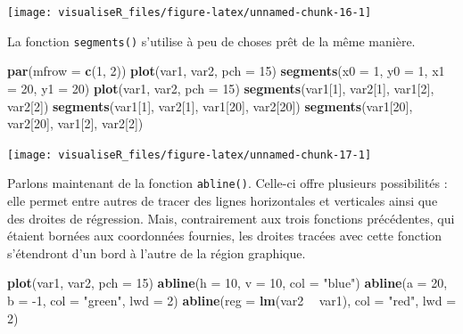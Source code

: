 \documentclass[]{article}
\newenvironment{Shaded}{\begin{snugshade}}{\end{snugshade}}
\newcommand{\DataTypeTok}[1]{\textcolor[rgb]{0.13,0.29,0.53}{#1}}
\newcommand{\DecValTok}[1]{\textcolor[rgb]{0.00,0.00,0.81}{#1}}
\newcommand{\KeywordTok}[1]{\textcolor[rgb]{0.13,0.29,0.53}{\textbf{#1}}}
\newcommand{\NormalTok}[1]{#1}
\newcommand{\OperatorTok}[1]{\textcolor[rgb]{0.81,0.36,0.00}{\textbf{#1}}}
\newcommand{\StringTok}[1]{\textcolor[rgb]{0.31,0.60,0.02}{#1}}
\begin{document}
\begin{center}\texttt{[image: visualiseR\_files/figure-latex/unnamed-chunk-16-1]} \end{center}

La fonction \texttt{segments()} s'utilise à peu de choses prêt de la même manière.

\begin{Shaded}
\begin{Highlighting}[]
\KeywordTok{par}\NormalTok{(}\DataTypeTok{mfrow =} \KeywordTok{c}\NormalTok{(}\DecValTok{1}\NormalTok{, }\DecValTok{2}\NormalTok{))}
\KeywordTok{plot}\NormalTok{(var1, var2, }\DataTypeTok{pch =} \DecValTok{15}\NormalTok{)}
\KeywordTok{segments}\NormalTok{(}\DataTypeTok{x0 =} \DecValTok{1}\NormalTok{, }\DataTypeTok{y0 =} \DecValTok{1}\NormalTok{, }\DataTypeTok{x1 =} \DecValTok{20}\NormalTok{, }\DataTypeTok{y1 =} \DecValTok{20}\NormalTok{)}
\KeywordTok{plot}\NormalTok{(var1, var2, }\DataTypeTok{pch =} \DecValTok{15}\NormalTok{)}
\KeywordTok{segments}\NormalTok{(var1[}\DecValTok{1}\NormalTok{], var2[}\DecValTok{1}\NormalTok{], var1[}\DecValTok{2}\NormalTok{], var2[}\DecValTok{2}\NormalTok{])}
\KeywordTok{segments}\NormalTok{(var1[}\DecValTok{1}\NormalTok{], var2[}\DecValTok{1}\NormalTok{], var1[}\DecValTok{20}\NormalTok{], var2[}\DecValTok{20}\NormalTok{])}
\KeywordTok{segments}\NormalTok{(var1[}\DecValTok{20}\NormalTok{], var2[}\DecValTok{20}\NormalTok{], var1[}\DecValTok{2}\NormalTok{], var2[}\DecValTok{2}\NormalTok{])}
\end{Highlighting}
\end{Shaded}

\begin{center}\texttt{[image: visualiseR\_files/figure-latex/unnamed-chunk-17-1]} \end{center}

Parlons maintenant de la fonction \texttt{abline()}. Celle-ci offre plusieurs possibilités : elle permet entre autres de tracer des lignes horizontales et verticales ainsi que des droites de régression. Mais, contrairement aux trois fonctions précédentes, qui étaient bornées aux coordonnées fournies, les droites tracées avec cette fonction s'étendront d'un bord à l'autre de la région graphique.

\begin{Shaded}
\begin{Highlighting}[]
\KeywordTok{plot}\NormalTok{(var1, var2, }\DataTypeTok{pch =} \DecValTok{15}\NormalTok{)}
\KeywordTok{abline}\NormalTok{(}\DataTypeTok{h =} \DecValTok{10}\NormalTok{, }\DataTypeTok{v =} \DecValTok{10}\NormalTok{, }\DataTypeTok{col =} \StringTok{"blue"}\NormalTok{)}
\KeywordTok{abline}\NormalTok{(}\DataTypeTok{a =} \DecValTok{20}\NormalTok{, }\DataTypeTok{b =} \DecValTok{-1}\NormalTok{, }\DataTypeTok{col =} \StringTok{"green"}\NormalTok{, }\DataTypeTok{lwd =} \DecValTok{2}\NormalTok{)}
\KeywordTok{abline}\NormalTok{(}\DataTypeTok{reg =} \KeywordTok{lm}\NormalTok{(var2 }\OperatorTok{~}\StringTok{ }\NormalTok{var1), }\DataTypeTok{col =} \StringTok{"red"}\NormalTok{, }\DataTypeTok{lwd =} \DecValTok{2}\NormalTok{)}
\end{Highlighting}
\end{Shaded}
\end{document}
